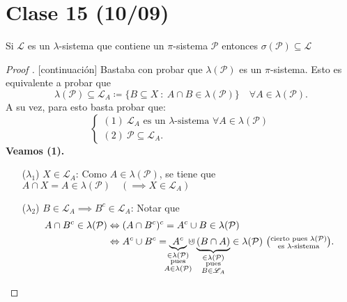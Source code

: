 \section{Clase 15 (10/09)}

\begin{theorem}[Dynkin]
	Si $\mathscr{L}$ es un $\lambda$-sistema que contiene un $\pi$-sistema $\mathcal{P}$ entonces $\sigma(\mathcal{P}) \subseteq \mathscr{L}$
\end{theorem}
\begin{proof}[Proof ][continuación]
	Bastaba con probar que $\lambda{}(\mathcal{P})$ es un $\pi $-sistema. Esto es equivalente a probar que
	\[ \lambda(\mathcal{P}) \subseteq \mathscr{L}_A \coloneq \{B \subseteq X \ : \ A \cap B \in \lambda(\mathcal{P})\} \quad \forall A \in \lambda(\mathcal{P}). \]
	A su vez, para esto basta probar que:
	\[ \begin{cases}
		(1) \ \mathscr{L}_A \text{ es un } \lambda \text{-sistema } \forall A \in \lambda(\mathcal{P}) \\
		(2) \ \mathcal{P} \subseteq \mathscr{L}_A.
	\end{cases} \]
	\textbf{Veamos (1).}
	\begin{enumerate}
		\item[($\lambda_{1}$)] $X \in \mathscr{L}_A$: Como $A \in \lambda(\mathcal{P})$, se tiene que $A \cap X = A \in \lambda(\mathcal{P}) \quad (\implies X \in \mathscr{L}_A)$ \checkmark

		\item[($\lambda_{2}$)] $B \in \mathscr{L}_A \implies B^c \in \mathscr{L}_A$: Notar que
		\begin{align*}
			A \cap B^c \in \lambda(\mathcal{P}) & \iff (A \cap B^c)^c = A^c \cup B \in \lambda(\mathcal{P}) \\
			& \iff A^c \cup B^c = \underbrace{A^c}_{\mathclap{\substack{\in \lambda(\mathcal{P}) \\ \text{pues} \\ A \in \lambda(\mathcal{P})}}} \cupd \underbrace{(B \cap A)}_{\mathclap{\substack{\in \lambda(\mathcal{P}) \\ \text{pues} \\ B \in \mathscr{L}_A}}} \in \lambda(\mathcal{P}) \ \big(\substack{\text{cierto pues } \lambda(\mathcal{P}) \\ \text{es } \lambda \text{-sistema}}\big)
		.\end{align*}


\end{enumerate}
\end{proof}
